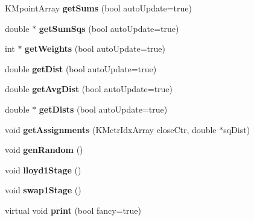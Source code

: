 \begin{DoxyCompactItemize}
\item 
\hypertarget{class_k_mfilter_centers_a9224a2085d9494ec99f889de917bd5c1}{
KMpointArray {\bfseries getSums} (bool autoUpdate=true)}
\label{class_k_mfilter_centers_a9224a2085d9494ec99f889de917bd5c1}

\item 
\hypertarget{class_k_mfilter_centers_aef720474a3d4785ed054665038d608f8}{
double $\ast$ {\bfseries getSumSqs} (bool autoUpdate=true)}
\label{class_k_mfilter_centers_aef720474a3d4785ed054665038d608f8}

\item 
\hypertarget{class_k_mfilter_centers_aa69c3f0e244e3eb45a4235bf6bf0900a}{
int $\ast$ {\bfseries getWeights} (bool autoUpdate=true)}
\label{class_k_mfilter_centers_aa69c3f0e244e3eb45a4235bf6bf0900a}

\item 
\hypertarget{class_k_mfilter_centers_a745b4c9d2dc32cf0bdda0fdfc6e30e13}{
double {\bfseries getDist} (bool autoUpdate=true)}
\label{class_k_mfilter_centers_a745b4c9d2dc32cf0bdda0fdfc6e30e13}

\item 
\hypertarget{class_k_mfilter_centers_aea19371fe543a7a0941be8d304d3d359}{
double {\bfseries getAvgDist} (bool autoUpdate=true)}
\label{class_k_mfilter_centers_aea19371fe543a7a0941be8d304d3d359}

\item 
\hypertarget{class_k_mfilter_centers_aeffb7d56a249f656c6598c905fe53c5b}{
double $\ast$ {\bfseries getDists} (bool autoUpdate=true)}
\label{class_k_mfilter_centers_aeffb7d56a249f656c6598c905fe53c5b}

\item 
\hypertarget{class_k_mfilter_centers_a571cb3d1631b7b2c468db877baf66a5c}{
void {\bfseries getAssignments} (KMctrIdxArray closeCtr, double $\ast$sqDist)}
\label{class_k_mfilter_centers_a571cb3d1631b7b2c468db877baf66a5c}

\item 
\hypertarget{class_k_mfilter_centers_abb36f5d2f10f53056a561ec51db67ba7}{
void {\bfseries genRandom} ()}
\label{class_k_mfilter_centers_abb36f5d2f10f53056a561ec51db67ba7}

\item 
\hypertarget{class_k_mfilter_centers_a9c8991539aff906c3b54dffeb7b3b62d}{
void {\bfseries lloyd1Stage} ()}
\label{class_k_mfilter_centers_a9c8991539aff906c3b54dffeb7b3b62d}

\item 
\hypertarget{class_k_mfilter_centers_a14f46a46a2cc5adc6e2fbdc36221fd88}{
void {\bfseries swap1Stage} ()}
\label{class_k_mfilter_centers_a14f46a46a2cc5adc6e2fbdc36221fd88}

\item 
\hypertarget{class_k_mfilter_centers_adc2a0437ac4b026d19f383317857e3ac}{
virtual void {\bfseries print} (bool fancy=true)}
\label{class_k_mfilter_centers_adc2a0437ac4b026d19f383317857e3ac}

\end{DoxyCompactItemize}
